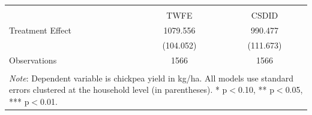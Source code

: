\begin{tabular}{l*{2}{c}} 
\\[-1.8ex]\hline \hline \\[-1.8ex] 
& \multicolumn{1}{c}{TWFE} & 
\multicolumn{1}{c}{CSDID} \\ \midrule
\midrule
Treatment Effect    &    1079.556\sym{***}&     990.477\sym{***}\\
                    &   (104.052)         &   (111.673)         \\
\midrule
Observations        &        1566         &        1566         \\
\hline \hline \\[-1.8ex] 
\multicolumn{3}{p{\linewidth}}{\small 
\noindent \textit{Note}: Dependent variable 
is chickpea yield in kg/ha. All models use 
standard errors clustered at the 
household level (in parentheses). 
* p$<$0.10, ** p$<$0.05, *** p$<$0.01.} 
\end{tabular}
